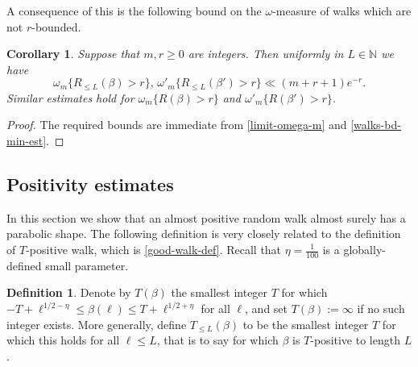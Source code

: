 \documentclass[11pt,reqno]{amsart}
\numberwithin{equation}{section}
\newtheorem{corollary}[theorem]{Corollary}
\theoremstyle{definition}
\newtheorem{definition}[theorem]{Definition}
\theoremstyle{remark}
\renewcommand{\le}{\leqslant}
\renewcommand{\ge}{\geqslant}
\newcommand\N{\mathbb{N}}
\begin{document}
A consequence of this is the following bound on the $\omega$-measure of walks which are not $r$-bounded.

\begin{corollary}\label{omega-bdedness-est}
Suppose that $m, r \ge 0$ are integers. Then uniformly in $L \in \N$ we have 
\[ \omega_m \{  R_{\le L}(\beta) > r\}, \, \omega'_m \{  R_{\le L}(\beta') > r\} \ll (m + r+1) e^{-r}. \] Similar estimates hold for $\omega_m\{R(\beta) > r\}$ and $\omega'_m\{ R(\beta') > r\}$.
\end{corollary}
\begin{proof} The required bounds are immediate from \cref{limit-omega-m} and \cref{walks-bd-min-est}.\end{proof}


\subsection{Positivity estimates} In this section we show that an almost positive random walk almost surely has a parabolic shape. The following definition is very closely related to the definition of $T$-positive walk, which is \cref{good-walk-def}.
Recall that $\eta = \frac{1}{100}$ is a globally-defined small parameter.

\begin{definition}
Denote by $T(\beta)$ the smallest integer $T$ for which $-T + \ell^{1/2 - \eta} \le \beta(\ell) \le T + \ell^{1/2 + \eta}$ for all $\ell$, and set $T(\beta) := \infty$ if no such integer exists. More generally, define $T_{\le L}(\beta)$ to be the smallest integer $T$ for which this holds for all $\ell \le L$, that is to say for which $\beta$ is $T$-positive to length $L$.
\end{definition}
\end{document}

